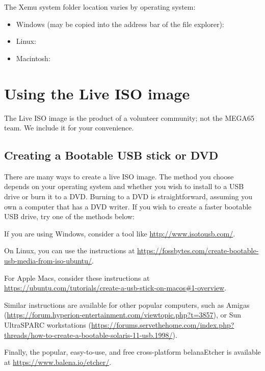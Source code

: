 The Xemu system folder location varies by operating system:

\begin{itemize}
    \item Windows (may be copied into the address bar of the file explorer):
    \item Linux:
    \item Macintosh:
\end{itemize}

\section{Using the Live ISO image}
\label{sec:live-iso-image}

The Live ISO image is the product of a volunteer community; not the MEGA65 team. We include it for your convenience.

\subsection{Creating a Bootable USB stick or DVD}

There are many ways to create a live ISO image. The method you choose depends on your operating system and whether you wish to install to a USB drive or burn it to a DVD. Burning to a DVD is straightforward, assuming you own a computer that has a DVD writer. If you wish to create a faster bootable USB drive, try one of the methods below:

If you are using Windows, consider a tool like \url{http://www.isotousb.com/}.

On Linux, you can use the instructions at \url{https://fossbytes.com/create-bootable-usb-media-from-iso-ubuntu/}.

For Apple Macs, consider these instructions at
\url{https://ubuntu.com/tutorials/create-a-usb-stick-on-macos#1-overview}.

Similar instructions are available for other popular computers, such as Amigas (\url{https://forum.hyperion-entertainment.com/viewtopic.php?t=3857}), or Sun UltraSPARC workstations (\url{https://forums.servethehome.com/index.php?threads/how-to-create-a-bootable-solaris-11-usb.1998/}).

Finally, the popular, easy-to-use, and free cross-platform belanaEtcher is available at \url{https://www.balena.io/etcher/}.

